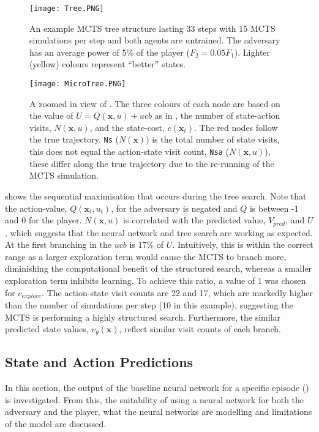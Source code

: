 \documentclass[../main.tex]{subfiles}
\begin{document}
\begin{figure}[H]
    \centering
    \texttt{[image: Tree.PNG]}
    \caption{An example MCTS tree structure lasting 33 steps with 15 MCTS simulations per step and both agents are untrained. The adversary has an average power of 5\% of the player ($F_2 = 0.05F_1$). Lighter (yellow) colours represent ``better'' states.}
    \label{fig:tree}
    \vspace{0.7cm}
    \centering
    \texttt{[image: MicroTree.PNG]}
    \caption{A zoomed in view of . The three colours of each node are based on the value of $U=Q(\boldsymbol{x}, u) + ucb$ as in , the number of state-action visits, $N(\boldsymbol{x}, u)$, and the state-cost, $c(\boldsymbol{x}_t)$. The red nodes follow the true trajectory. \texttt{Ns} ($N(\boldsymbol{x})$) is the total number of state visits, this does not equal the action-state visit count, \texttt{Nsa} ($N(\boldsymbol{x}, u)$), these differ along the true trajectory due to the re-running of the MCTS simulation.}
    \label{fig:microtree}
\end{figure}

 shows the sequential maximisation that occurs during the tree search. Note that the action-value, $Q(\boldsymbol{x}_t, u_t)$, for the adversary is negated and $Q$ is between -1 and 0 for the player. $N(\boldsymbol{x}, u)$ is correlated with the predicted value, $V_{pred}$, and $U$, which suggests that the neural network and tree search are working as expected. At the first branching in  the $ucb$ is 17\% of $U$. Intuitively, this is within the correct range as a larger exploration term would cause the MCTS to branch more, diminishing the computational benefit of the structured search, whereas a smaller exploration term inhibits learning. To achieve this ratio, a value of 1 was chosen for $c_{explore}$. The action-state visit counts are 22 and 17, which are markedly higher than the number of simulations per step (10 in this example), suggesting the MCTS is performing a highly structured search. Furthermore, the similar predicted state values, $v_\theta(\boldsymbol{x})$, reflect similar visit counts of each branch.

\subsection{State and Action Predictions}

In this section, the output of the baseline neural network for a specific episode () is investigated. From this, the suitability of using a neural network for both the adversary and the player, what the neural networks are modelling and limitations of the model are discussed.
\end{document}
